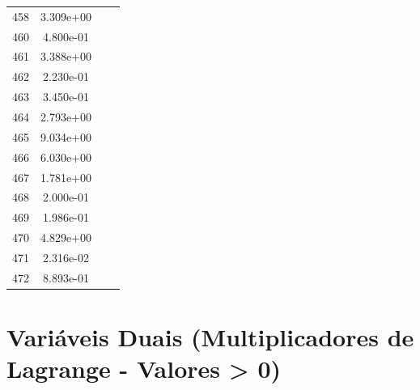 \documentclass[12pt]{article}
\begin{document}
\begin{longtable}{@{}cccc@{}}
458 & 3.309e+00 &  &  \\
460 & 4.800e-01 &  &  \\
461 & 3.388e+00 &  &  \\
462 & 2.230e-01 &  &  \\
463 & 3.450e-01 &  &  \\
464 & 2.793e+00 &  &  \\
465 & 9.034e+00 &  &  \\
466 & 6.030e+00 &  &  \\
467 & 1.781e+00 &  &  \\
468 & 2.000e-01 &  &  \\
469 & 1.986e-01 &  &  \\
470 & 4.829e+00 &  &  \\
471 & 2.316e-02 &  &  \\
472 & 8.893e-01 &  &  \\

\bottomrule
\end{longtable}


\section{Variáveis Duais (Multiplicadores de Lagrange - Valores > 0)}
\end{document}

